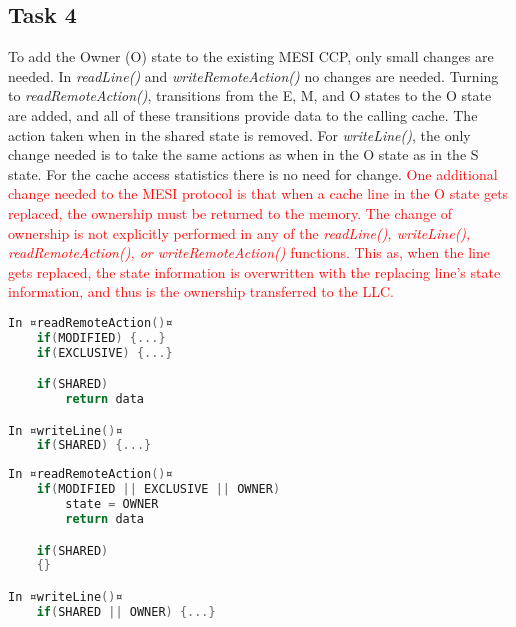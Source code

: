 \subsection{Task 4}
To add the Owner (O) state to the existing MESI CCP, only small changes are needed. In \textit{readLine()} and \textit{writeRemoteAction()} no changes are needed. Turning to \textit{readRemoteAction()}, transitions from the E, M, and O states to the O state are added, and all of these transitions provide data to the calling cache. The action taken when in the shared state is removed. For \textit{writeLine()}, the only change needed is to take the same actions as when in the O state as in the S state. For the cache access statistics there is no need for change. \textcolor{red}{One additional change needed to the MESI protocol is that when a cache line in the O state gets replaced, the ownership must be returned to the memory. The change of ownership is not explicitly performed in any of the \textit{readLine(), writeLine(), readRemoteAction(), or writeRemoteAction()} functions. This as, when the line gets replaced, the state information is overwritten with the replacing line's state information, and thus is the ownership transferred to the LLC.}

\par\noindent


\begin{minipage}[t]{.5\textwidth}

	\begin{lstlisting}[language=C,frame=lrtb,style=base]
In ¤readRemoteAction()¤
	if(MODIFIED) {...}
	if(EXCLUSIVE) {...}

	if(SHARED)
		return data		

In ¤writeLine()¤
	if(SHARED) {...}
	\end{lstlisting}%
\end{minipage}%
\hfill
\begin{minipage}[t]{.5\textwidth}

	\begin{lstlisting}[language=C,frame=lrtb,style=base]
In ¤readRemoteAction()¤
	if(MODIFIED || EXCLUSIVE || OWNER) 
		state = OWNER
		return data

	if(SHARED)
	{}

In ¤writeLine()¤
	if(SHARED || OWNER) {...}
	\end{lstlisting}%
\end{minipage}%
